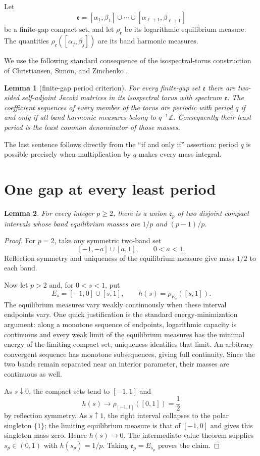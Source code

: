\documentclass[11pt]{article}
\newtheorem{lemma}{Lemma}
\newcommand{\e}{\mathfrak e}
\begin{document}
Let
\[
 \e=[\alpha_1,\beta_1]\cup\cdots\cup
 [\alpha_{\ell+1},\beta_{\ell+1}]
\]
be a finite-gap compact set, and let $\rho_{\e}$ be its logarithmic
equilibrium measure.  The quantities
$\rho_{\e}([\alpha_j,\beta_j])$ are its band harmonic measures.

We use the following standard consequence of the isospectral-torus
construction of Christiansen, Simon, and Zinchenko \cite[Corollaries 4.5 and
6.4]{CSZ}.

\begin{lemma}[finite-gap period criterion]\label{lem:fg}
For every finite-gap set $\e$ there are two-sided self-adjoint Jacobi matrices
in its isospectral torus with spectrum $\e$.  The coefficient sequences of
every member of the torus are periodic with period $q$ if and only if all band
harmonic measures belong to $q^{-1}\mathbb Z$.  Consequently their least
period is the least common denominator of those masses.
\end{lemma}

The last sentence follows directly from the ``if and only if'' assertion:
period $q$ is possible precisely when multiplication by $q$ makes every mass
integral.

\section{One gap at every least period}

\begin{lemma}\label{lem:mass}
For every integer $p\geq2$, there is a union $\e_p$ of two disjoint compact
intervals whose band equilibrium masses are $1/p$ and $(p-1)/p$.
\end{lemma}

\begin{proof}
For $p=2$, take any symmetric two-band set
\[
 [-1,-a]\cup[a,1],\qquad 0<a<1.
\]
Reflection symmetry and uniqueness of the equilibrium measure give mass
$1/2$ to each band.

Now let $p>2$ and, for $0<s<1$, put
\[
 E_s=[-1,0]\cup[s,1],\qquad
 h(s)=\rho_{E_s}([s,1]).
\]
The equilibrium measures vary weakly continuously when these interval
endpoints vary.  One quick justification is the standard energy-minimization
argument: along a monotone sequence of endpoints, logarithmic capacity is
continuous and every weak limit of the equilibrium measures has the minimal
energy of the limiting compact set; uniqueness identifies that limit.  An
arbitrary convergent sequence has monotone subsequences, giving full
continuity.  Since the two bands remain separated near an interior parameter,
their masses are continuous as well.

As $s\downarrow0$, the compact sets tend to $[-1,1]$ and
\[
 h(s)\longrightarrow \rho_{[-1,1]}([0,1])=\frac12
\]
by reflection symmetry.  As $s\uparrow1$, the right interval collapses to the
polar singleton $\{1\}$; the limiting equilibrium measure is that of
$[-1,0]$ and gives this singleton mass zero.  Hence $h(s)\to0$.  The
intermediate value theorem supplies $s_p\in(0,1)$ with $h(s_p)=1/p$.
Taking $\e_p=E_{s_p}$ proves the claim.
\end{proof}
\end{document}
